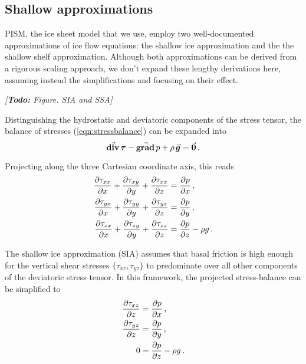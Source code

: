 \documentclass{article}
\newcommand{\todo}[1]{\emph{[\textbf{Todo:} #1]}}
\newcommand{\vect}[1]{\va*{#1}} %
\newcommand{\tens}[1]{\vb*{#1}} %
\renewcommand{\grad}[1]{\vect{\mathrm{grad}}\,#1}   %
\newcommand{\tdiv}[1]{\vect{\mathrm{div}}\,#1}      %
\newcommand{\DST}[0]{\tens{\tau}}       %
\begin{document}
\subsection{Shallow approximations}

PISM, the ice sheet model that we use, employ two well-documented
approximations of ice flow equations: the shallow ice approximation and the
the shallow shelf approximation. Although both approximations can be derived
from a rigorous scaling approach, we don't expand these lengthy derivations
here, assuming instead the simplifications and focusing on their effect.

\todo{Figure. SIA and SSA}

Distinguishing the hydrostatic and deviatoric components of the stress tensor,
the balance of stresses (\ref{eqn:stressbalance}) can be expanded into
\begin{equation}
    \tdiv{\DST} - \grad{p} + \rho\,\vect{g} = \vect{0} \,.
\end{equation}

Projecting along the three Cartesian coordinate axis, this reads
\begin{subequations}
\label{eqn:fullstokes}
\begin{align}
    \pdv{\tau_{xx}}{x} + \pdv{\tau_{xy}}{y} + \pdv{\tau_{xz}}{z}
        &= \pdv{p}{x} \,, \\
    \pdv{\tau_{yx}}{x} + \pdv{\tau_{yy}}{y} + \pdv{\tau_{yz}}{z}
        &= \pdv{p}{y} \,, \\
    \pdv{\tau_{zx}}{x} + \pdv{\tau_{zy}}{y} + \pdv{\tau_{zz}}{z}
        &= \pdv{p}{z} - \rho g \,.
\end{align}
\end{subequations}

The shallow ice approximation (SIA) assumes that basal friction is high enough
for the vertical shear stresses $\{\tau_{xz}, \tau_{yz}\}$ to predominate over
all other components of the deviatoric stress tensor. In this framework, the
projected stress-balance can be simplified to
\begin{subequations}
\label{eqn:sia}
\begin{align}
    \label{eqn:siax}
    \pdv{\tau_{xz}}{z} &= \pdv{p}{x} \,, \\
    \label{eqn:siay}
    \pdv{\tau_{yz}}{z} &= \pdv{p}{y} \,, \\
    \label{eqn:siaz}
    0 &= \pdv{p}{z} - \rho g \,.
\end{align}
\end{subequations}
\end{document}
